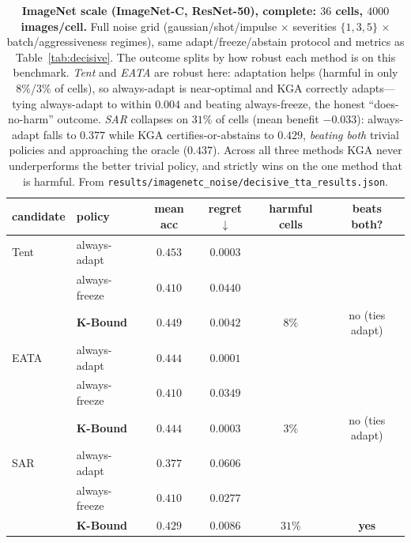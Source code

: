 \documentclass[conference]{IEEEtran}
\theoremstyle{plain}
\theoremstyle{definition}
\begin{document}
\begin{table}[t]\centering\small
\begin{tabular}{llcccc}
\toprule
candidate & policy & mean acc & regret$\downarrow$ & harmful cells & beats both? \\
\midrule
Tent & always-adapt     & $\mathbf{0.453}$ & $0.0003$ &        & \\
     & always-freeze    & $0.410$          & $0.0440$ &        & \\
     & \textbf{K-Bound} & $0.449$          & $0.0042$ & $8\%$  & no (ties adapt) \\
\midrule
EATA & always-adapt     & $\mathbf{0.444}$ & $0.0001$ &        & \\
     & always-freeze    & $0.410$          & $0.0349$ &        & \\
     & \textbf{K-Bound} & $0.444$          & $0.0003$ & $3\%$  & no (ties adapt) \\
\midrule
SAR  & always-adapt     & $0.377$          & $0.0606$ &        & \\
     & always-freeze    & $0.410$          & $0.0277$ &        & \\
     & \textbf{K-Bound} & $\mathbf{0.429}$ & $\mathbf{0.0086}$ & $31\%$ & \textbf{yes} \\
\bottomrule
\end{tabular}
\caption{\textbf{ImageNet scale (ImageNet-C, ResNet-50), complete: $36$ cells, $4000$ images/cell.}
Full noise grid (gaussian/shot/impulse $\times$ severities $\{1,3,5\}$ $\times$ batch/aggressiveness
regimes), same adapt/freeze/abstain protocol and metrics as Table~\ref{tab:decisive}. The outcome
splits by how robust each method is on this benchmark. \emph{Tent} and \emph{EATA} are robust here:
adaptation helps (harmful in only $8\%$/$3\%$ of cells), so always-adapt is near-optimal and
\textsc{KGA} correctly adapts---tying always-adapt to within $0.004$ and beating always-freeze, the
honest ``does-no-harm'' outcome. \emph{SAR} collapses on $31\%$ of cells (mean benefit $-0.033$):
always-adapt falls to $0.377$ while \textsc{KGA} certifies-or-abstains to $0.429$, \emph{beating
both} trivial policies and approaching the oracle ($0.437$). Across all three methods \textsc{KGA}
never underperforms the better trivial policy, and strictly wins on the one method that is harmful.
From \texttt{results/imagenetc\_noise/decisive\_tta\_results.json}.}
\label{tab:imagenetc}
\end{table}
\end{document}

